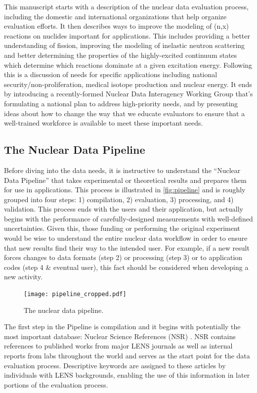 \documentclass[letterpaper]{ar-1col}
\begin{document}
This manuscript starts with a description of the nuclear data evaluation process, including the domestic and international organizations that help organize evaluation efforts.  It  then describes ways to improve the modeling of (n,x) reactions on nuclides important for applications.  This includes providing a better understanding of fission, improving the modeling of inelastic neutron scattering and better determining the properties of the highly-excited continuum states which determine which reactions dominate at a given excitation energy.
 Following this is a discussion of needs for specific applications including national security/non-proliferation, medical isotope production and nuclear energy.
 It ends by introducing a recently-formed Nuclear Data Interagency Working Group that's formulating a national plan to address high-priority needs, and by presenting ideas about how to change the way that we educate evaluators to ensure that a well-trained workforce is available to meet these important needs.

\subsection{The Nuclear Data Pipeline}
\label{sec:pipeline}

Before diving into the data needs, it is instructive to understand the \enquote{Nuclear Data Pipeline} that takes experimental or theoretical results and prepares them for use in applications.
 This process is illustrated in \autoref{fig:pipeline} and is roughly grouped into four steps: 1) compilation, 2) evaluation, 3) processing, and 4) validation.
 This process ends with the users and their application, but actually begins with the performance of carefully-designed measurements with well-defined uncertainties.
 Given this, those funding or performing the original experiment would be wise to understand the entire nuclear data workflow in order to ensure that new results find their way to the intended user.
 For example, if a new result forces changes to data formats (step 2) or processing (step 3) or to application codes (step 4 \& eventual user), this fact should be considered when developing a new activity.


\begin{figure}
\centering
\texttt{[image: pipeline\_cropped.pdf]}
\caption{\label{fig:pipeline}The nuclear data pipeline.}
\end{figure} 
 
The first step in the Pipeline is compilation and it begins with potentially the most important database: Nuclear Science References (NSR) \cite{NSR}.
 NSR contains references to published works from major LENS journals as well as internal reports from labs throughout the world and serves as the start point for the data evaluation process.
Descriptive keywords are assigned to these articles by individuals with LENS backgrounds, enabling the use of this information in later portions of the evaluation process.
  
\end{document}
